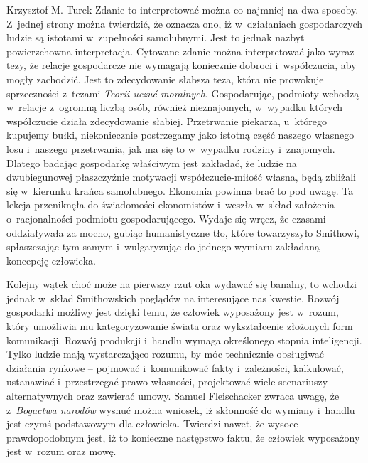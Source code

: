 \begin{artplenv}{Krzysztof M. Turek}
Zdanie to interpretować można co najmniej na dwa sposoby. Z~jednej strony można twierdzić, że oznacza ono,
iż w~działaniach gospodarczych ludzie są istotami w~zupełności samolubnymi. Jest to jednak nazbyt powierzchowna
interpretacja. Cytowane zdanie można interpretować jako wyraz tezy, że relacje gospodarcze nie wymagają koniecznie
dobroci i~współczucia, aby mogły zachodzić. Jest to zdecydowanie słabsza teza, która nie prowokuje
sprzeczności z~tezami \textit{Teorii uczuć moralnych}. Gospodarując, podmioty wchodzą w~relacje z~ogromną liczbą osób, również
nieznajomych, w~wypadku których współczucie działa zdecydowanie słabiej. Przetrwanie piekarza, u~którego kupujemy
bułki, niekoniecznie postrzegamy jako istotną część naszego własnego losu i~naszego przetrwania, jak ma się
to w~wypadku rodziny i~znajomych. Dlatego badając gospodarkę właściwym jest zakładać, że ludzie na dwubiegunowej
płaszczyźnie motywacji współczucie-miłość własna, będą zbliżali się w~kierunku krańca samolubnego. Ekonomia powinna
brać to pod uwagę. Ta lekcja przeniknęła do świadomości ekonomistów i~weszła w~skład założenia o~racjonalności podmiotu
gospodarującego. Wydaje się wręcz, że czasami oddziaływała za mocno, gubiąc humanistyczne tło, które towarzyszyło
Smithowi, spłaszczając tym samym i~wulgaryzując do jednego wymiaru zakładaną koncepcję człowieka.

Kolejny wątek choć może na pierwszy rzut oka wydawać się banalny, to wchodzi jednak w~skład Smithowskich poglądów na
interesujące nas kwestie. Rozwój gospodarki możliwy jest dzięki temu, że człowiek wyposażony jest w~rozum, który
umożliwia mu kategoryzowanie świata oraz wykształcenie złożonych form komunikacji. Rozwój produkcji i~handlu wymaga
określonego stopnia inteligencji. Tylko ludzie mają wystarczająco rozumu, by móc technicznie obsługiwać działania
rynkowe -- pojmować i~komunikować fakty i~zależności, kalkulować, ustanawiać i~przestrzegać prawo własności, projektować
wiele scenariuszy alternatywnych oraz zawierać umowy. Samuel Fleischacker
\parencite*[s.~19]{fleischacker_adam_2005}
zwraca uwagę, że z~\textit{Bogactwa narodów} wysnuć można
wniosek, iż skłonność do wymiany i~handlu jest czymś podstawowym dla człowieka. Twierdzi nawet, że wysoce
prawdopodobnym jest, iż to konieczne następstwo faktu, że człowiek wyposażony jest w~rozum oraz mowę.


\end{artplenv}
